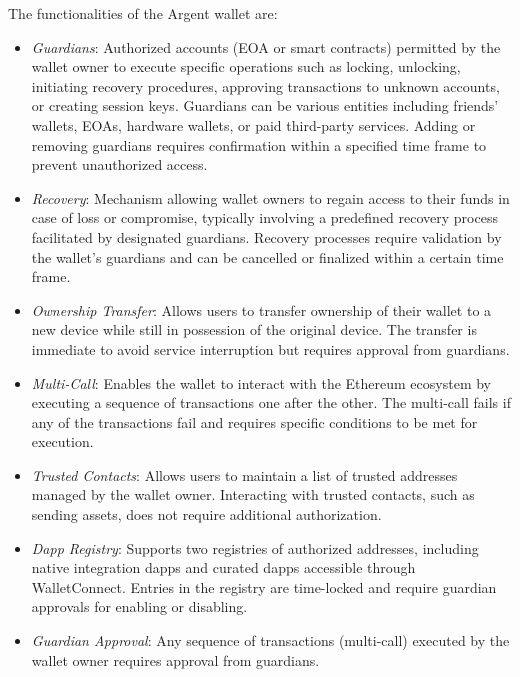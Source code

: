 


The functionalities of the Argent wallet are: \cite{argent-smart-wallet-specifications}
\begin{itemize}
    \item \textit{Guardians}: Authorized accounts (EOA or smart contracts) permitted by the wallet owner to execute specific operations such as locking, unlocking, initiating recovery procedures, approving transactions to unknown accounts, or creating session keys. Guardians can be various entities including friends' wallets, EOAs, hardware wallets, or paid third-party services. Adding or removing guardians requires confirmation within a specified time frame to prevent unauthorized access.
    \item \textit{Recovery}: Mechanism allowing wallet owners to regain access to their funds in case of loss or compromise, typically involving a predefined recovery process facilitated by designated guardians. Recovery processes require validation by the wallet's guardians and can be cancelled or finalized within a certain time frame.
    \item \textit{Ownership Transfer}: Allows users to transfer ownership of their wallet to a new device while still in possession of the original device. The transfer is immediate to avoid service interruption but requires approval from guardians.
    \item \textit{Multi-Call}: Enables the wallet to interact with the Ethereum ecosystem by executing a sequence of transactions one after the other. The multi-call fails if any of the transactions fail and requires specific conditions to be met for execution.
    \item \textit{Trusted Contacts}: Allows users to maintain a list of trusted addresses managed by the wallet owner. Interacting with trusted contacts, such as sending assets, does not require additional authorization.
    \item \textit{Dapp Registry}: Supports two registries of authorized addresses, including native integration dapps and curated dapps accessible through WalletConnect. Entries in the registry are time-locked and require guardian approvals for enabling or disabling.
    \item \textit{Guardian Approval}: Any sequence of transactions (multi-call) executed by the wallet owner requires approval from guardians.

\end{itemize}
